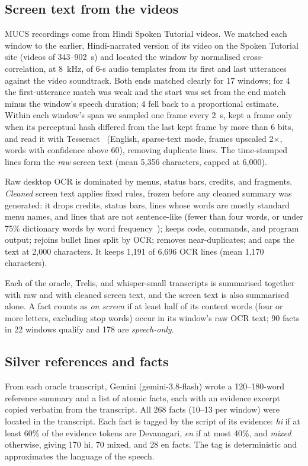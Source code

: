 \documentclass[conference]{IEEEtran}
\begin{document}
\subsection{Screen text from the videos}\label{sec:screen}
MUCS recordings come from Hindi Spoken Tutorial videos. We matched each window to the earlier, Hindi-narrated version of its video on the Spoken Tutorial site (videos of 343--902~s) and located the window by normalised cross-correlation, at 8~kHz, of 6-s audio templates from its first and last utterances against the video soundtrack. Both ends matched clearly for 17 windows; for 4 the first-utterance match was weak and the start was set from the end match minus the window's speech duration; 4 fell back to a proportional estimate. Within each window's span we sampled one frame every 2~s, kept a frame only when its perceptual hash differed from the last kept frame by more than 6 bits, and read it with Tesseract~\cite{smith2007tesseract} (English, sparse-text mode, frames upscaled 2$\times$, words with confidence above 60), removing duplicate lines. The time-stamped lines form the \emph{raw} screen text (mean 5,356 characters, capped at 6,000).

Raw desktop OCR is dominated by menus, status bars, credits, and fragments. \emph{Cleaned} screen text applies fixed rules, frozen before any cleaned summary was generated: it drops credits, status bars, lines whose words are mostly standard menu names, and lines that are not sentence-like (fewer than four words, or under 75\% dictionary words by word frequency~\cite{speer2022wordfreq}); keeps code, commands, and program output; rejoins bullet lines split by OCR; removes near-duplicates; and caps the text at 2,000 characters. It keeps 1,191 of 6,696 OCR lines (mean 1,170 characters).

Each of the oracle, Trelis, and whisper-small transcripts is summarised together with raw and with cleaned screen text, and the screen text is also summarised alone. A fact counts as \emph{on screen} if at least half of its content words (four or more letters, excluding stop words) occur in its window's raw OCR text; 90 facts in 22 windows qualify and 178 are \emph{speech-only}.

\subsection{Silver references and facts}\label{sec:facts}
From each oracle transcript, Gemini (gemini-3.8-flash) wrote a 120--180-word reference summary and a list of atomic facts, each with an evidence excerpt copied verbatim from the transcript. All 268 facts (10--13 per window) were located in the transcript. Each fact is tagged by the script of its evidence: \emph{hi} if at least 60\% of the evidence tokens are Devanagari, \emph{en} if at most 40\%, and \emph{mixed} otherwise, giving 170 hi, 70 mixed, and 28 en facts. The tag is deterministic and approximates the language of the speech.
\end{document}
